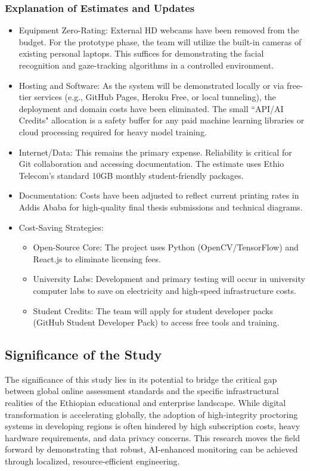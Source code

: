 \subsubsection{Explanation of Estimates and Updates}
\begin{itemize}
    \item Equipment Zero-Rating: External HD webcams have been removed from the budget. For the prototype phase, the team will utilize the built-in cameras of existing personal laptops. This suffices for demonstrating the facial recognition and gaze-tracking algorithms in a controlled environment.
    \item Hosting and Software: As the system will be demonstrated locally or via free-tier services (e.g., GitHub Pages, Heroku Free, or local tunneling), the deployment and domain costs have been eliminated. The small ``API/AI Credits" allocation is a safety buffer for any paid machine learning libraries or cloud processing required for heavy model training.
    \item Internet/Data: This remains the primary expense. Reliability is critical for Git collaboration and accessing documentation. The estimate uses Ethio Telecom’s standard 10GB monthly student-friendly packages.
    \item Documentation: Costs have been adjusted to reflect current printing rates in Addis Ababa for high-quality final thesis submissions and technical diagrams.
    \item Cost-Saving Strategies:
    \begin{itemize}
        \item Open-Source Core: The project uses Python (OpenCV/TensorFlow) and React.js to eliminate licensing fees.
        \item University Labs: Development and primary testing will occur in university computer labs to save on electricity and high-speed infrastructure costs.
        \item Student Credits: The team will apply for student developer packs (GitHub Student Developer Pack) to access free tools and training.
    \end{itemize}
\end{itemize}

\subsection{Significance of the Study}
The significance of this study lies in its potential to bridge the critical gap between global online assessment standards and the specific infrastructural realities of the Ethiopian educational and enterprise landscape. While digital transformation is accelerating globally, the adoption of high-integrity proctoring systems in developing regions is often hindered by high subscription costs, heavy hardware requirements, and data privacy concerns. This research moves the field forward by demonstrating that robust, AI-enhanced monitoring can be achieved through localized, resource-efficient engineering.

